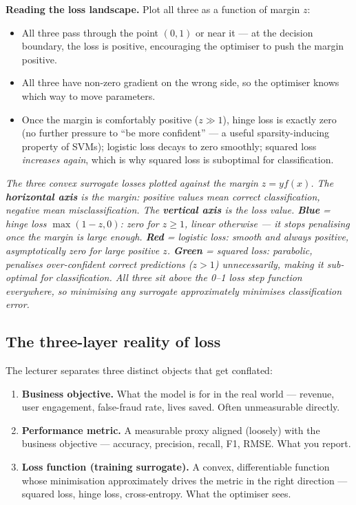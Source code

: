 \documentclass[11pt, a4paper]{article}
\begin{document}
\textbf{Reading the loss landscape.} Plot all three as a function of margin $z$:
\begin{itemize}
  \item All three pass through the point $(0, 1)$ or near it — at the decision boundary, the loss is positive, encouraging the optimiser to push the margin positive.
  \item All three have non-zero gradient on the wrong side, so the optimiser knows which way to move parameters.
  \item Once the margin is comfortably positive ($z \gg 1$), hinge loss is exactly zero (no further pressure to ``be more confident'' — a useful sparsity-inducing property of SVMs); logistic loss decays to zero smoothly; squared loss \emph{increases again}, which is why squared loss is suboptimal for classification.
\end{itemize}

\begin{center}

\footnotesize\textit{The three convex surrogate losses plotted against the margin $z = yf(x)$. The \textbf{horizontal axis} is the margin: positive values mean correct classification, negative mean misclassification. The \textbf{vertical axis} is the loss value. \textbf{Blue} = hinge loss $\max(1-z, 0)$: zero for $z\ge1$, linear otherwise --- it stops penalising once the margin is large enough. \textbf{Red} = logistic loss: smooth and always positive, asymptotically zero for large positive $z$. \textbf{Green} = squared loss: parabolic, penalises over-confident correct predictions ($z>1$) unnecessarily, making it sub-optimal for classification. All three sit \emph{above} the 0--1 loss step function everywhere, so minimising any surrogate approximately minimises classification error.}
\end{center}

\subsection{The three-layer reality of loss}

\begin{defbox}
The lecturer separates three distinct objects that get conflated:
\begin{enumerate}
  \item \textbf{Business objective.} What the model is for in the real world — revenue, user engagement, false-fraud rate, lives saved. Often unmeasurable directly.
  \item \textbf{Performance metric.} A measurable proxy aligned (loosely) with the business objective — accuracy, precision, recall, F1, RMSE. What you report.
  \item \textbf{Loss function (training surrogate).} A convex, differentiable function whose minimisation approximately drives the metric in the right direction — squared loss, hinge loss, cross-entropy. What the optimiser sees.
\end{enumerate}
\end{defbox}
\end{document}
